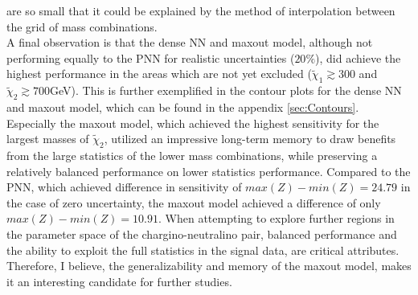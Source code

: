 are so small that it could be explained by the method of interpolation between the grid of mass combinations.
\\
A final observation is that the dense \ac{NN} and maxout model, although not performing equally to the \ac{PNN} for realistic uncertainties ($20\%$), did achieve the highest performance in 
the areas which are not yet excluded ($\tilde{\chi}_1\gtrsim300$ and $\tilde{\chi}_2\gtrsim700$GeV). This is further exemplified in the contour plots for the dense \ac{NN} and maxout model, which 
can be found in the appendix \ref{sec:Contours}. Especially the maxout model, which achieved the highest sensitivity for the largest 
masses of $\tilde{\chi}_2$, utilized an impressive long-term memory to draw benefits from the large statistics of the lower mass combinations, while preserving a relatively balanced performance on 
lower statistics performance. Compared to the \ac{PNN}, which achieved difference in sensitivity of $max(Z)-min(Z) = 24.79$ in the case of zero uncertainty, the maxout model achieved a difference 
of only $max(Z)-min(Z) = 10.91$. When attempting to explore further regions in the parameter space of the chargino-neutralino pair, balanced performance and the ability to exploit the full statistics in the 
signal data, are critical attributes. Therefore, I believe, the generalizability and memory of the maxout model, makes it an interesting candidate for further studies.
